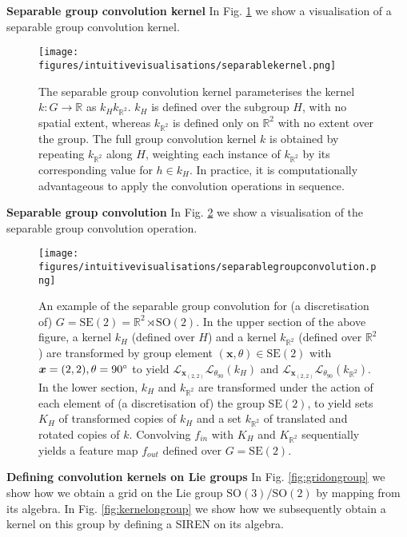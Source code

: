 \documentclass[nohyperref]{article}
\theoremstyle{plain}
\theoremstyle{definition}
\theoremstyle{remark}
\begin{document}
\textbf{Separable group convolution kernel} In Fig. \ref{fig:separablekernel} we show a visualisation of a separable group convolution kernel.

\begin{figure}
\centering
\texttt{[image: figures/intuitivevisualisations/separablekernel.png]}
\caption[Separable group convolution kernel]{The separable group convolution kernel parameterises the kernel $k:G\rightarrow\mathbb{R}$ as $k_H k_{\mathbb{R}^2}$. $k_H$ is defined over the subgroup $H$, with no spatial extent, whereas $k_{\mathbb{R}^2}$ is defined only on $\mathbb{R}^2$ with no extent over the group. The full group convolution kernel $k$ is obtained by repeating $k_{\mathbb{R}^2}$ along $H$, weighting each instance of $k_{\mathbb{R}^2}$ by its corresponding value for $h \in k_H$. In practice, it is computationally advantageous to apply the convolution operations in sequence.}
\label{fig:separablekernel}
\end{figure}

\textbf{Separable group convolution} In Fig. \ref{fig:sepgroupconv} we show a visualisation of the separable group convolution operation.

\begin{figure}
\centering
\texttt{[image: figures/intuitivevisualisations/separablegroupconvolution.png]}
\caption[Separable group convolution]{An example of the separable group convolution for (a discretisation of) $G=\mathrm{SE(2)}=\mathbb{R}^2\rtimes \mathrm{SO(2)}$. In the upper section of the above figure, a kernel $k_H$ (defined over $H$) and a kernel $k_{\mathbb{R}^2}$ (defined over $\mathbb{R}^2$) are transformed by group element $(\boldsymbol{x}, \theta) \in \mathrm{SE(2)}$ with $\boldsymbol{x}=(2,2),\theta=90\degree$ to yield $\mathcal{L}_{\boldsymbol{x}_{(2,2)}}\mathcal{L}_{\theta_{90}}(k_H)$ and $\mathcal{L}_{\boldsymbol{x}_{(2,2)}}\mathcal{L}_{\theta_{90}}(k_{\mathbb{R}^2})$. In the lower section, $k_H$ and $k_{\mathbb{R}^2}$ are transformed under the action of each element of (a discretisation of) the group $\mathrm{SE(2)}$, to yield sets $K_H$ of transformed copies of $k_H$ and a set $k_{\mathbb{R}^2}$ of translated and rotated copies of $k$. Convolving $f_{in}$ with $K_H$ and $K_{\mathbb{R}^2}$ sequentially yields a feature map $f_{out}$ defined over $G=\mathrm{SE(2)}$.}
\label{fig:sepgroupconv}
\end{figure}

\textbf{Defining convolution kernels on Lie groups} In Fig. \ref{fig:gridongroup} we show how we obtain a grid on the Lie group $\mathrm{SO(3)}/\mathrm{SO(2)}$ by mapping from its algebra. In Fig. \ref{fig:kernelongroup} we show how we subsequently obtain a kernel on this group by defining a SIREN on its algebra.
\end{document}
